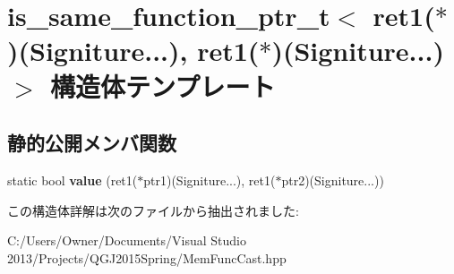 \hypertarget{structis__same__function__ptr__t_3_01ret1_07_5_08_07_signiture_8_8_8_08_00_01ret1_07_5_08_07_signiture_8_8_8_08_4}{}\section{is\+\_\+same\+\_\+function\+\_\+ptr\+\_\+t$<$ ret1($\ast$)(Signiture...), ret1($\ast$)(Signiture...)$>$ 構造体テンプレート}
\label{structis__same__function__ptr__t_3_01ret1_07_5_08_07_signiture_8_8_8_08_00_01ret1_07_5_08_07_signiture_8_8_8_08_4}
\subsection*{静的公開メンバ関数}
\begin{DoxyCompactItemize}
\item 
static bool {\bfseries value} (ret1($\ast$ptr1)(Signiture...), ret1($\ast$ptr2)(Signiture...))\hypertarget{structis__same__function__ptr__t_3_01ret1_07_5_08_07_signiture_8_8_8_08_00_01ret1_07_5_08_07_signiture_8_8_8_08_4_ab93d88e12c13f0a3be5ab61ae7efea37}{}\label{structis__same__function__ptr__t_3_01ret1_07_5_08_07_signiture_8_8_8_08_00_01ret1_07_5_08_07_signiture_8_8_8_08_4_ab93d88e12c13f0a3be5ab61ae7efea37}

\end{DoxyCompactItemize}


この構造体詳解は次のファイルから抽出されました\+:\begin{DoxyCompactItemize}
\item 
C\+:/\+Users/\+Owner/\+Documents/\+Visual Studio 2013/\+Projects/\+Q\+G\+J2015\+Spring/Mem\+Func\+Cast.\+hpp\end{DoxyCompactItemize}
